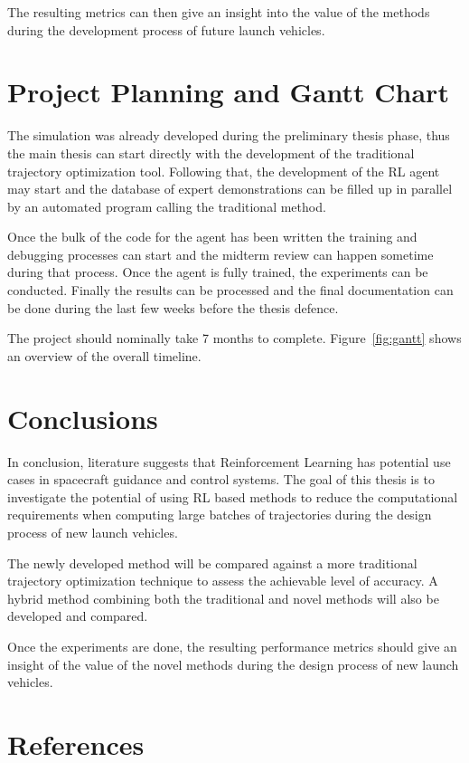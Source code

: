 \documentclass[12pt, english, NoHyper]{AE4010-template}
\begin{document}
The resulting metrics can then give an insight into the value of the methods during the development process of future launch vehicles.


\section{Project Planning and Gantt Chart}
The simulation was already developed during the preliminary thesis phase, thus the main thesis can start directly with the development of the traditional trajectory optimization tool. Following that, the development of the RL agent may start and the database of expert demonstrations can be filled up in parallel by an automated program calling the traditional method.

Once the bulk of the code for the agent has been written the training and debugging processes can start and the midterm review can happen sometime during that process. Once the agent is fully trained, the experiments can be conducted. Finally the results can be processed and the final documentation can be done during the last few weeks before the thesis defence.

The project should nominally take 7 months to complete. Figure~\ref{fig:gantt} shows an overview of the overall timeline.


\section{Conclusions}
In conclusion, literature suggests that Reinforcement Learning has potential use cases in spacecraft guidance and control systems. The goal of this thesis is to investigate the potential of using RL based methods to reduce the computational requirements when computing large batches of trajectories during the design process of new launch vehicles.

The newly developed method will be compared against a more traditional trajectory optimization technique to assess the achievable level of accuracy. A hybrid method combining both the traditional and novel methods will also be developed and compared.

Once the experiments are done, the resulting performance metrics should give an insight of the value of the novel methods during the design process of new launch vehicles. 

\section{References}
\end{document}
